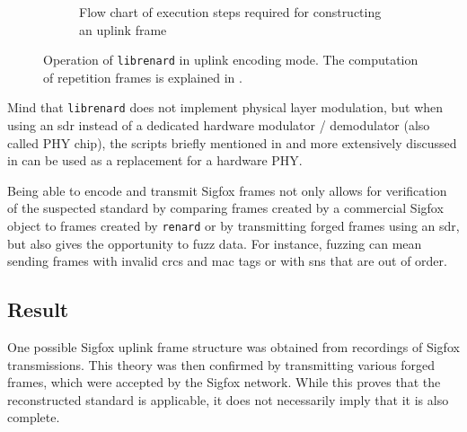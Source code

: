 \begin{figure}[h]
\begin{subfigure}[c]{1.0\textwidth}
		\caption{Flow chart of execution steps required for constructing an uplink frame}
	\end{subfigure}
	\caption{Operation of \texttt{librenard} in uplink encoding mode. The computation of repetition frames is explained in .}
	\label{fig:librenard_uplink}
\end{figure}

Mind that \texttt{librenard} does not implement physical layer modulation, but when using an \gls{sdr} instead of a dedicated hardware modulator / demodulator (also called PHY chip), the scripts briefly mentioned in  and more extensively discussed in  can be used as a replacement for a hardware PHY.

Being able to encode and transmit Sigfox frames not only allows for verification of the suspected standard by comparing frames created by a commercial Sigfox object to frames created by \texttt{renard} or by transmitting forged frames using an \gls{sdr}, but also gives the opportunity to fuzz data.
For instance, fuzzing can mean sending frames with invalid \glspl{crc} and \gls{mac} tags or with \glspl{sn} that are out of order.

\subsection{Result}
\label{sec:uplink_frameformat_result}
One possible Sigfox uplink frame structure was obtained from recordings of Sigfox transmissions.
This theory was then confirmed by transmitting various forged frames, which were accepted by the Sigfox network.
While this proves that the reconstructed standard is applicable, it does not necessarily imply that it is also complete. 

